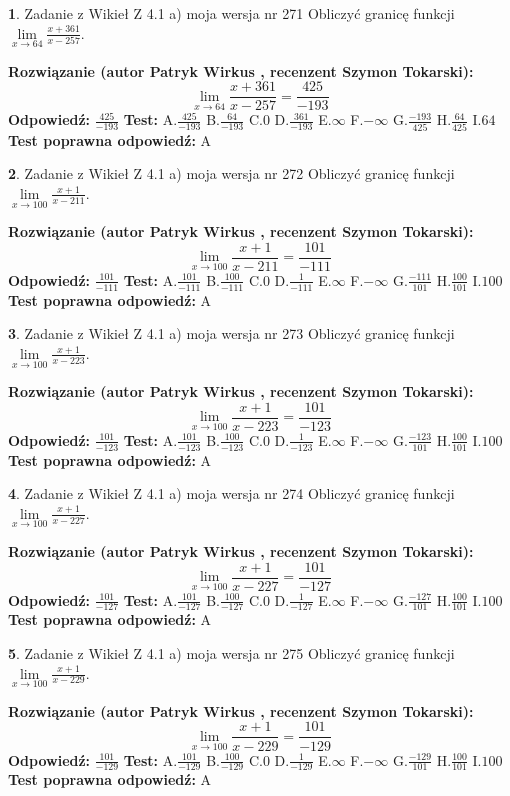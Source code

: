 \documentclass[12pt, a4paper]{article}
\theoremstyle{definition} %
\newtheorem{zad}{}
\newcommand{\zadStart}[1]{\begin{zad}#1\newline}
\newcommand{\zadStop}{\end{zad}}
\newcommand{\rozwStart}[2]{\noindent \textbf{Rozwiązanie (autor #1 , recenzent #2): }\newline}
\newcommand{\rozwStop}{\newline}
\newcommand{\odpStart}{\noindent \textbf{Odpowiedź:}\newline}
\newcommand{\odpStop}{\newline}
\newcommand{\testStart}{\noindent \textbf{Test:}\newline}
\newcommand{\testStop}{\newline}
\newcommand{\kluczStart}{\noindent \textbf{Test poprawna odpowiedź:}\newline}
\newcommand{\kluczStop}{\newline}
\begin{document}
\zadStart{Zadanie z Wikieł Z 4.1 a) moja wersja nr 271}
Obliczyć granicę funkcji $\lim\limits_{x\to64}\frac{x+361}{x-257}$.
\zadStop
\rozwStart{Patryk Wirkus}{Szymon Tokarski}
$$\lim\limits_{x\to64}\frac{x+361}{x-257} = \frac{425}{-193}$$
\rozwStop
\odpStart
$\frac{425}{-193}$
\odpStop
\testStart
A.$\frac{425}{-193}$
B.$\frac{64}{-193}$
C.$0$
D.$\frac{361}{-193}$
E.$\infty$
F.$-\infty$
G.$\frac{-193}{425}$
H.$\frac{64}{425}$
I.$64$
\testStop
\kluczStart
A
\kluczStop



\zadStart{Zadanie z Wikieł Z 4.1 a) moja wersja nr 272}
Obliczyć granicę funkcji $\lim\limits_{x\to100}\frac{x+1}{x-211}$.
\zadStop
\rozwStart{Patryk Wirkus}{Szymon Tokarski}
$$\lim\limits_{x\to100}\frac{x+1}{x-211} = \frac{101}{-111}$$
\rozwStop
\odpStart
$\frac{101}{-111}$
\odpStop
\testStart
A.$\frac{101}{-111}$
B.$\frac{100}{-111}$
C.$0$
D.$\frac{1}{-111}$
E.$\infty$
F.$-\infty$
G.$\frac{-111}{101}$
H.$\frac{100}{101}$
I.$100$
\testStop
\kluczStart
A
\kluczStop



\zadStart{Zadanie z Wikieł Z 4.1 a) moja wersja nr 273}
Obliczyć granicę funkcji $\lim\limits_{x\to100}\frac{x+1}{x-223}$.
\zadStop
\rozwStart{Patryk Wirkus}{Szymon Tokarski}
$$\lim\limits_{x\to100}\frac{x+1}{x-223} = \frac{101}{-123}$$
\rozwStop
\odpStart
$\frac{101}{-123}$
\odpStop
\testStart
A.$\frac{101}{-123}$
B.$\frac{100}{-123}$
C.$0$
D.$\frac{1}{-123}$
E.$\infty$
F.$-\infty$
G.$\frac{-123}{101}$
H.$\frac{100}{101}$
I.$100$
\testStop
\kluczStart
A
\kluczStop



\zadStart{Zadanie z Wikieł Z 4.1 a) moja wersja nr 274}
Obliczyć granicę funkcji $\lim\limits_{x\to100}\frac{x+1}{x-227}$.
\zadStop
\rozwStart{Patryk Wirkus}{Szymon Tokarski}
$$\lim\limits_{x\to100}\frac{x+1}{x-227} = \frac{101}{-127}$$
\rozwStop
\odpStart
$\frac{101}{-127}$
\odpStop
\testStart
A.$\frac{101}{-127}$
B.$\frac{100}{-127}$
C.$0$
D.$\frac{1}{-127}$
E.$\infty$
F.$-\infty$
G.$\frac{-127}{101}$
H.$\frac{100}{101}$
I.$100$
\testStop
\kluczStart
A
\kluczStop



\zadStart{Zadanie z Wikieł Z 4.1 a) moja wersja nr 275}
Obliczyć granicę funkcji $\lim\limits_{x\to100}\frac{x+1}{x-229}$.
\zadStop
\rozwStart{Patryk Wirkus}{Szymon Tokarski}
$$\lim\limits_{x\to100}\frac{x+1}{x-229} = \frac{101}{-129}$$
\rozwStop
\odpStart
$\frac{101}{-129}$
\odpStop
\testStart
A.$\frac{101}{-129}$
B.$\frac{100}{-129}$
C.$0$
D.$\frac{1}{-129}$
E.$\infty$
F.$-\infty$
G.$\frac{-129}{101}$
H.$\frac{100}{101}$
I.$100$
\testStop
\kluczStart
A
\kluczStop
\end{document}

